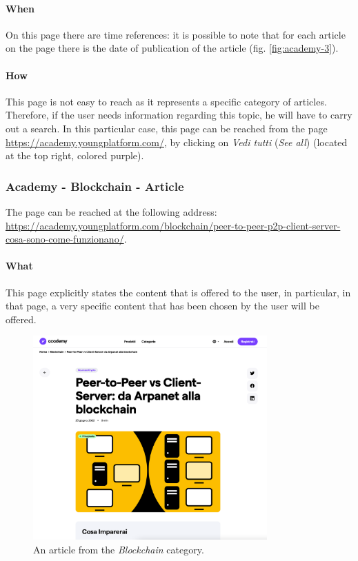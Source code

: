 \paragraph{When}

On this page there are time references: it is possible to note that for 
each article on the page there is the date of publication of the article 
(fig. \ref{fig:academy-3}).

\paragraph{How}

This page is not easy to reach as it represents a specific category of 
articles. Therefore, if the user needs information regarding this topic, 
he will have to carry out a search. In this particular case, this page can 
be reached from the page 
\href{https://academy.youngplatform.com/}{https://academy.youngplatform.com/}, 
by clicking on \textit{Vedi tutti} (\textit{See all}) (located at the top 
right, colored purple).

\subsubsection{Academy - Blockchain - Article}

The page can be reached at the following address: \\
\href{https://academy.youngplatform.com/blockchain/peer-to-peer-p2p-client-server-cosa-sono-come-funzionano/}{https://academy.youngplatform.com/blockchain/peer-to-peer-p2p-client-server-cosa-sono-come-funzionano/}.

\paragraph{What}

This page explicitly states the content that is offered to the user, in 
particular, in that page, a very specific content that has been chosen by 
the user will be offered.

\begin{figure}[H]
  \centering
  \includegraphics[width=0.80\textwidth]{res/images/internal-pages/academy/academy-5.png}
  \caption{An article from the \textit{Blockchain} category.}
  \label{fig:academy-5}
\end{figure}

